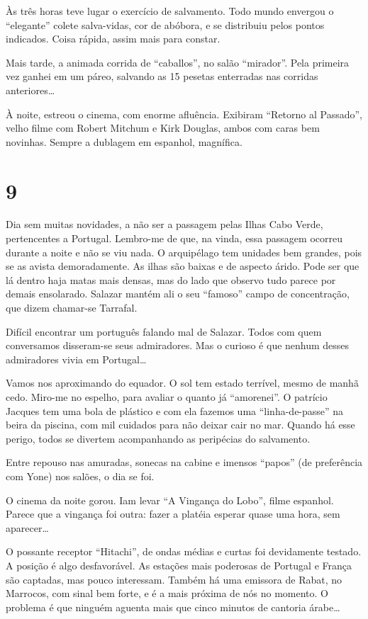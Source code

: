 Às três horas teve lugar o exercício de salvamento. Todo mundo envergou o ``elegante'' colete salva-vidas, cor de abóbora, e se distribuiu pelos pontos indicados. Coisa rápida, assim mais para constar.

Mais tarde, a animada corrida de ``caballos'', no salão ``mirador''. Pela primeira vez ganhei em um páreo, salvando as 15 pesetas enterradas nas corridas anteriores\ldots

À noite, estreou o cinema, com enorme afluência. Exibiram ``Retorno al Passado'', velho filme com Robert Mitchum e Kirk Douglas, ambos com caras bem novinhas. Sempre a dublagem em espanhol, magnífica.

\section*{9 \adfflatleafright {}}
Dia sem muitas novidades, a não ser a passagem pelas Ilhas Cabo Verde, pertencentes a Portugal. Lembro-me de que, na vinda, essa passagem ocorreu durante a noite e não se viu nada. O arquipélago tem unidades bem grandes, pois se as avista demoradamente. As ilhas são baixas e de aspecto árido. Pode ser que lá dentro haja matas mais densas, mas do lado que observo tudo parece por demais ensolarado. Salazar mantém ali o seu ``famoso'' campo de concentração, que dizem chamar-se Tarrafal.

Difícil encontrar um português falando mal de Salazar. Todos com quem conversamos disseram-se seus admiradores. Mas o curioso é que nenhum desses admiradores vivia em Portugal\ldots

Vamos nos aproximando do equador. O sol tem estado terrível, mesmo de manhã cedo. Miro-me no espelho, para avaliar o quanto já ``amorenei''. O patrício Jacques tem uma bola de plástico e com ela fazemos uma ``linha-de-passe'' na beira da piscina, com mil cuidados para não deixar cair no mar. Quando há esse perigo, todos se divertem acompanhando as peripécias do salvamento.

Entre repouso nas amuradas, sonecas na cabine e imensos ``papos'' (de preferência com Yone) nos salões, o dia se foi.

O cinema da noite gorou. Iam levar ``A Vingança do Lobo'', filme espanhol. Parece que a vingança foi outra: fazer a platéia esperar quase uma hora, sem aparecer\ldots

O possante receptor ``Hitachi'', de ondas médias e curtas foi devidamente testado. A posição é algo desfavorável. As estações mais poderosas de Portugal e França são captadas, mas pouco interessam. Também há uma emissora de Rabat, no Marrocos, com sinal bem forte, e é a mais próxima de nós no momento. O problema é que ninguém aguenta mais que cinco minutos de cantoria árabe\ldots

